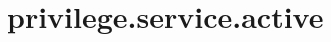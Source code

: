 \section{privilege.service.active}
\label{configuration:PrivilegeServiceActive}
\AvailableInCsharpOnly{\TODO}